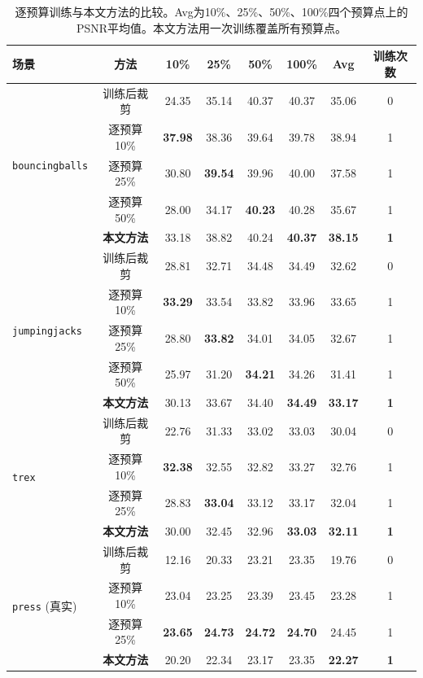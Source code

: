 \documentclass[sn-mathphys]{sn-jnl}
\begin{document}
\begin{table}[!htbp]
\caption{逐预算训练与本文方法的比较。Avg为10\%、25\%、50\%、100\%四个预算点上的PSNR平均值。本文方法用一次训练覆盖所有预算点。}
\label{tab:per_budget_full}
\centering
\scriptsize
\setlength{\tabcolsep}{3pt}
\begin{tabular}{lccccccc}
\toprule
场景 & 方法 & 10\% & 25\% & 50\% & 100\% & Avg & 训练次数 \\
\midrule
\multirow{5}{*}{\texttt{bouncingballs}} & 训练后裁剪   & 24.35 & 35.14 & 40.37 & 40.37 & 35.06 & 0 \\
& 逐预算10\% & \textbf{37.98} & 38.36 & 39.64 & 39.78 & 38.94 & 1 \\
& 逐预算25\% & 30.80 & \textbf{39.54} & 39.96 & 40.00 & 37.58 & 1 \\
& 逐预算50\% & 28.00 & 34.17 & \textbf{40.23} & 40.28 & 35.67 & 1 \\
& \textbf{本文方法}    & 33.18 & 38.82 & 40.24 & \textbf{40.37} & \textbf{38.15} & \textbf{1} \\
\midrule
\multirow{5}{*}{\texttt{jumpingjacks}} & 训练后裁剪   & 28.81 & 32.71 & 34.48 & 34.49 & 32.62 & 0 \\
& 逐预算10\% & \textbf{33.29} & 33.54 & 33.82 & 33.96 & 33.65 & 1 \\
& 逐预算25\% & 28.80 & \textbf{33.82} & 34.01 & 34.05 & 32.67 & 1 \\
& 逐预算50\% & 25.97 & 31.20 & \textbf{34.21} & 34.26 & 31.41 & 1 \\
& \textbf{本文方法}    & 30.13 & 33.67 & 34.40 & \textbf{34.49} & \textbf{33.17} & \textbf{1} \\
\midrule
\multirow{4}{*}{\texttt{trex}} & 训练后裁剪   & 22.76 & 31.33 & 33.02 & 33.03 & 30.04 & 0 \\
& 逐预算10\% & \textbf{32.38} & 32.55 & 32.82 & 33.27 & 32.76 & 1 \\
& 逐预算25\% & 28.83 & \textbf{33.04} & 33.12 & 33.17 & 32.04 & 1 \\
& \textbf{本文方法}    & 30.00 & 32.45 & 32.96 & \textbf{33.03} & \textbf{32.11} & \textbf{1} \\
\midrule
\multirow{4}{*}{\texttt{press} (真实)} & 训练后裁剪   & 12.16 & 20.33 & 23.21 & 23.35 & 19.76 & 0 \\
& 逐预算10\% & 23.04 & 23.25 & 23.39 & 23.45 & 23.28 & 1 \\
& 逐预算25\% & \textbf{23.65} & \textbf{24.73} & \textbf{24.72} & \textbf{24.70} & 24.45 & 1 \\
& \textbf{本文方法}    & 20.20 & 22.34 & 23.17 & 23.35 & \textbf{22.27} & \textbf{1} \\
\bottomrule
\end{tabular}
\end{table}
\end{document}
